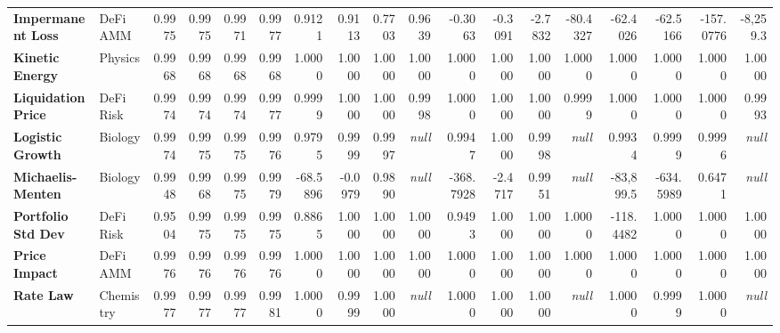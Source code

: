 \documentclass[10pt]{article}
\begin{document}
\begin{landscape}
\begin{adjustbox}{width=\linewidth,center}
\begin{tabular}{l l *{4}{r} *{4}{r} *{4}{r} *{4}{r}}
\textbf{Impermanent Loss} & DeFi AMM & 0.9975 & 0.9975 & \cellcolor{match}0.9971 & \cellcolor{match}0.9977 & 0.9121 & 0.9113 & \cellcolor{minor}0.7703 & \cellcolor{minor}0.9639 & -0.3063 & -0.3091 & \cellcolor{major}-2.7832 & \cellcolor{major}-80.4327 & -62.4026 & -62.5166 & \cellcolor{major}-157.0776 & \cellcolor{major}-8{,}259.3 \\
\textbf{Kinetic Energy} & Physics & 0.9968 & 0.9968 & \cellcolor{match}0.9968 & \cellcolor{match}0.9968 & 1.0000 & 1.0000 & \cellcolor{match}1.0000 & \cellcolor{match}1.0000 & 1.0000 & 1.0000 & \cellcolor{match}1.0000 & \cellcolor{match}1.0000 & 1.0000 & 1.0000 & \cellcolor{match}1.0000 & \cellcolor{match}1.0000 \\
\textbf{Liquidation Price} & DeFi Risk & 0.9974 & 0.9974 & \cellcolor{match}0.9974 & \cellcolor{match}0.9977 & 0.9999 & 1.0000 & \cellcolor{match}1.0000 & \cellcolor{match}0.9998 & 1.0000 & 1.0000 & \cellcolor{match}1.0000 & \cellcolor{match}0.9999 & 1.0000 & 1.0000 & \cellcolor{match}1.0000 & \cellcolor{match}0.9993 \\
\textbf{Logistic Growth} & Biology & 0.9974 & 0.9975 & \cellcolor{match}0.9975 & \cellcolor{match}0.9976 & 0.9795 & 0.9999 & \cellcolor{minor}0.9997 & \cellcolor{major}\textit{null} & 0.9947 & 1.0000 & \cellcolor{match}0.9998 & \cellcolor{major}\textit{null} & 0.9934 & 0.9999 & \cellcolor{match}0.9996 & \cellcolor{major}\textit{null} \\
\textbf{Michaelis-Menten} & Biology & 0.9948 & 0.9968 & \cellcolor{match}0.9975 & \cellcolor{match}0.9979 & -68.5896 & -0.0979 & \cellcolor{major}0.9890 & \cellcolor{major}\textit{null} & -368.7928 & -2.4717 & \cellcolor{major}0.9951 & \cellcolor{major}\textit{null} & -83{,}899.5 & -634.5989 & \cellcolor{major}0.6471 & \cellcolor{major}\textit{null} \\
\textbf{Portfolio Std Dev} & DeFi Risk & 0.9504 & 0.9975 & \cellcolor{minor}0.9975 & \cellcolor{match}0.9975 & 0.8865 & 1.0000 & \cellcolor{minor}1.0000 & \cellcolor{match}1.0000 & 0.9493 & 1.0000 & \cellcolor{minor}1.0000 & \cellcolor{match}1.0000 & -118.4482 & 1.0000 & \cellcolor{major}1.0000 & \cellcolor{match}1.0000 \\
\textbf{Price Impact} & DeFi AMM & 0.9976 & 0.9976 & \cellcolor{match}0.9976 & \cellcolor{match}0.9976 & 1.0000 & 1.0000 & \cellcolor{match}1.0000 & \cellcolor{match}1.0000 & 1.0000 & 1.0000 & \cellcolor{match}1.0000 & \cellcolor{match}1.0000 & 1.0000 & 1.0000 & \cellcolor{match}1.0000 & \cellcolor{match}1.0000 \\
\textbf{Rate Law} & Chemistry & 0.9977 & 0.9977 & \cellcolor{match}0.9977 & \cellcolor{match}0.9981 & 1.0000 & 0.9999 & \cellcolor{match}1.0000 & \cellcolor{major}\textit{null} & 1.0000 & 1.0000 & \cellcolor{match}1.0000 & \cellcolor{major}\textit{null} & 1.0000 & 0.9999 & \cellcolor{match}1.0000 & \cellcolor{major}\textit{null} \\

\end{tabular}
\end{adjustbox}
\end{landscape}
\end{document}
